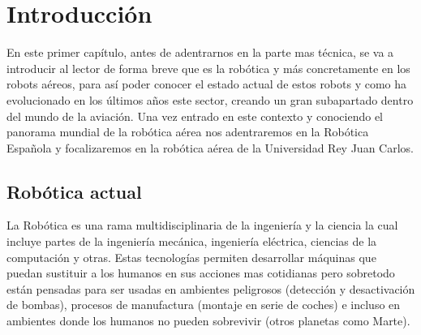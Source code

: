 \chapter{Introducción}\label{cap.introduccion}
\hspace{1cm} En este primer capítulo, antes de adentrarnos en la parte mas técnica, se va a introducir al lector de forma breve que es la robótica y más concretamente en los robots aéreos, para así poder conocer el estado actual de estos robots y como ha evolucionado en los últimos años este sector, creando un gran subapartado dentro del mundo de la aviación. Una vez entrado en este contexto y conociendo el panorama mundial de la robótica aérea nos adentraremos en la Robótica Española y focalizaremos en la robótica aérea de la Universidad Rey Juan Carlos.

\section{Robótica actual}
\hspace{1cm} La Robótica es una rama multidisciplinaria de la ingeniería y la ciencia la cual incluye partes de la ingeniería mecánica, ingeniería eléctrica, ciencias de la computación y otras. Estas tecnologías permiten desarrollar máquinas que puedan sustituir a los humanos en sus acciones mas cotidianas pero sobretodo están pensadas para ser usadas en ambientes peligrosos (detección y desactivación de bombas), procesos de manufactura (montaje en serie de coches) e incluso en ambientes donde los humanos no pueden sobrevivir (otros planetas como Marte).

